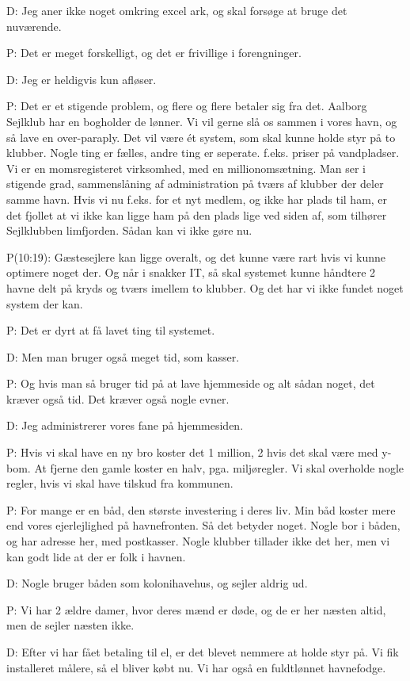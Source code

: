 \documentclass{article}
\begin{document}
D: Jeg aner ikke noget omkring excel ark, og skal forsøge at bruge det nuværende.

P: Det er meget forskelligt, og det er frivillige i forengninger.

D: Jeg er heldigvis kun afløser.

P: Det er et stigende problem, og flere og flere betaler sig fra det. Aalborg Sejlklub har en bogholder de lønner. Vi vil gerne slå os sammen i vores havn, og så lave en over-paraply. Det vil være ét system, som skal kunne holde styr på to klubber. Nogle ting er fælles, andre ting er seperate. f.eks. priser på vandpladser. Vi er en momsregisteret virksomhed, med en millionomsætning. Man ser i stigende grad, sammenslåning af administration på tværs af klubber der deler samme havn. Hvis vi nu f.eks. for et nyt medlem, og ikke har plads til ham, er det fjollet at vi ikke kan ligge ham på den plads lige ved siden af, som tilhører Sejlklubben limfjorden. Sådan kan vi ikke gøre nu.

P(10:19): Gæstesejlere kan ligge overalt, og det kunne være rart hvis vi kunne optimere noget der. Og når i snakker IT, så skal systemet kunne håndtere 2 havne delt på kryds og tværs imellem to klubber. Og det har vi ikke fundet noget system der kan.

P: Det er dyrt at få lavet ting til systemet.

D: Men man bruger også meget tid, som kasser.

P: Og hvis man så bruger tid på at lave hjemmeside og alt sådan noget, det kræver også tid. Det kræver også nogle evner.

D: Jeg administrerer vores fane på hjemmesiden.

P: Hvis vi skal have en ny bro koster det 1 million, 2 hvis det skal være med y-bom. At fjerne den gamle koster en halv, pga. miljøregler. Vi skal overholde nogle regler, hvis vi skal have tilskud fra kommunen.

P: For mange er en båd, den største investering i deres liv. Min båd koster mere end vores ejerlejlighed på havnefronten. Så det betyder noget. Nogle bor i båden, og har adresse her, med postkasser. Nogle klubber tillader ikke det her, men vi kan godt lide at der er folk i havnen.

D: Nogle bruger båden som kolonihavehus, og sejler aldrig ud.

P: Vi har 2 ældre damer, hvor deres mænd er døde, og de er her næsten altid, men de sejler næsten ikke.

D: Efter vi har fået betaling til el, er det blevet nemmere at holde styr på. Vi fik installeret målere, så el bliver købt nu. Vi har også en fuldtlønnet havnefodge.
\end{document}
